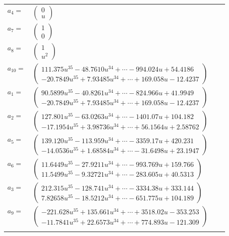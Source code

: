 \documentclass[1p]{elsarticle_modified}
\theoremstyle{definition}
\begin{document}
\begin{tabular}{m{7pt} m{180pt} m{7pt} m{180pt} }
\flushright $a_{4}=$&$\begin{pmatrix}0\\u\end{pmatrix}$ \\
\flushright $a_{7}=$&$\begin{pmatrix}1\\0\end{pmatrix}$ \\
\flushright $a_{8}=$&$\begin{pmatrix}1\\u^2\end{pmatrix}$ \\
\flushright $a_{10}=$&$\begin{pmatrix}111.375 u^{35}-48.7610 u^{34}+\cdots-994.024 u+54.4186\\-20.7849 u^{35}+7.93485 u^{34}+\cdots+169.058 u-12.4237\end{pmatrix}$ \\
\flushright $a_{1}=$&$\begin{pmatrix}90.5899 u^{35}-40.8261 u^{34}+\cdots-824.966 u+41.9949\\-20.7849 u^{35}+7.93485 u^{34}+\cdots+169.058 u-12.4237\end{pmatrix}$ \\
\flushright $a_{2}=$&$\begin{pmatrix}127.801 u^{35}-63.0263 u^{34}+\cdots-1401.07 u+104.182\\-17.1954 u^{35}+3.98736 u^{34}+\cdots+56.1564 u+2.58762\end{pmatrix}$ \\
\flushright $a_{5}=$&$\begin{pmatrix}139.120 u^{35}-113.959 u^{34}+\cdots-3359.17 u+420.231\\-14.0536 u^{35}+1.68584 u^{34}+\cdots-31.6498 u+23.1947\end{pmatrix}$ \\
\flushright $a_{6}=$&$\begin{pmatrix}11.6449 u^{35}-27.9211 u^{34}+\cdots-993.769 u+159.766\\11.5499 u^{35}-9.32721 u^{34}+\cdots-283.605 u+40.5313\end{pmatrix}$ \\
\flushright $a_{3}=$&$\begin{pmatrix}212.315 u^{35}-128.741 u^{34}+\cdots-3334.38 u+333.144\\7.82658 u^{35}-18.5212 u^{34}+\cdots-651.775 u+104.189\end{pmatrix}$ \\
\flushright $a_{9}=$&$\begin{pmatrix}-221.628 u^{35}+135.661 u^{34}+\cdots+3518.02 u-353.253\\-11.7841 u^{35}+22.6573 u^{34}+\cdots+774.893 u-121.309\end{pmatrix}$\\&\end{tabular}
\end{document}
